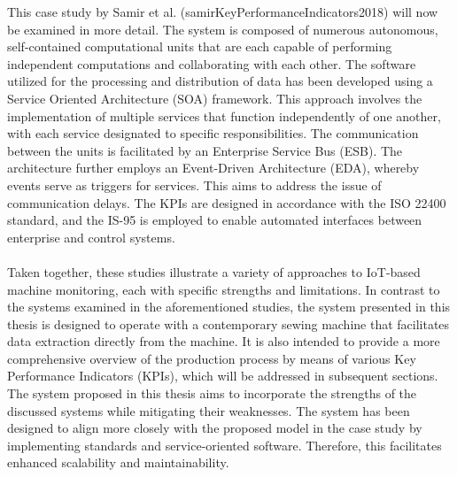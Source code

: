 This case study by Samir et al. (samirKeyPerformanceIndicators2018) will now be examined in more detail. The system is composed of numerous autonomous, self-contained computational units that are each capable of performing independent computations and collaborating with each other. The software utilized for the processing and distribution of data has been developed using a Service Oriented Architecture (SOA) framework. This approach involves the implementation of multiple services that function independently of one another, with each service designated to specific responsibilities. The communication between the units is facilitated by an Enterprise Service Bus (ESB). The architecture further employs an Event-Driven Architecture (EDA), whereby events serve as triggers for services. This aims to address the issue of communication delays. The KPIs are designed in accordance with the ISO 22400 standard, and the IS-95 is employed to enable automated interfaces between enterprise and control systems.
\\\\
Taken together, these studies illustrate a variety of approaches to IoT-based machine monitoring, each with specific strengths and limitations.
In contrast to the systems examined in the aforementioned studies, the system presented in this thesis is designed to operate with a contemporary sewing machine that facilitates data extraction directly from the machine. It is also intended to provide a more comprehensive overview of the production process by means of various Key Performance Indicators (KPIs), which will be addressed in subsequent sections.
The system proposed in this thesis aims to incorporate the strengths of the discussed systems while mitigating their weaknesses. The system has been designed to align more closely with the proposed model in the case study by implementing standards and service-oriented software. Therefore, this facilitates enhanced scalability and maintainability.

